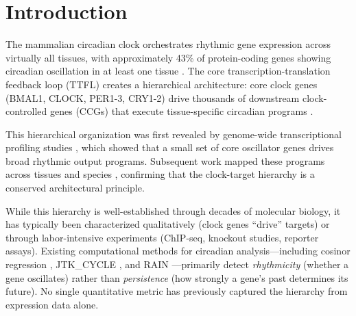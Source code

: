 \documentclass[11pt,letterpaper]{article}
\begin{document}
\begin{abstract}
\noindent\textbf{Conclusions:} The AR(2) eigenvalue modulus is a valid, robust, and biologically meaningful measure of temporal persistence in gene expression. A two-coefficient model recovers circadian hierarchy without prior biological knowledge, validated across species, tissues, experimental perturbations, literature benchmarks, and non-circadian contexts.

\noindent\textbf{Keywords:} autoregressive model, eigenvalue modulus, circadian rhythm, temporal persistence, gene expression, cross-species validation, literature validation, falsification
\end{abstract}

\section{Introduction}

The mammalian circadian clock orchestrates rhythmic gene expression across virtually all tissues, with approximately 43\% of protein-coding genes showing circadian oscillation in at least one tissue \citep{zhang2014circadian}. The core transcription-translation feedback loop (TTFL) creates a hierarchical architecture: core clock genes (BMAL1, CLOCK, PER1-3, CRY1-2) drive thousands of downstream clock-controlled genes (CCGs) that execute tissue-specific circadian programs \citep{takahashi2017transcriptional, reppert2002coordination}.

This hierarchical organization was first revealed by genome-wide transcriptional profiling studies \citep{panda2002coordinated, storch2002extensive, ueda2002system}, which showed that a small set of core oscillator genes drives broad rhythmic output programs. Subsequent work mapped these programs across tissues and species \citep{zhang2014circadian, mure2018diurnal, storch2007daily}, confirming that the clock-target hierarchy is a conserved architectural principle.

While this hierarchy is well-established through decades of molecular biology, it has typically been characterized qualitatively (clock genes ``drive'' targets) or through labor-intensive experiments (ChIP-seq, knockout studies, reporter assays). Existing computational methods for circadian analysis---including cosinor regression \citep{cornelissen2014cosinor}, JTK\_CYCLE \citep{hughes2010jtk}, and RAIN \citep{thaben2014detecting}---primarily detect \textit{rhythmicity} (whether a gene oscillates) rather than \textit{persistence} (how strongly a gene's past determines its future). No single quantitative metric has previously captured the hierarchy from expression data alone.
\end{document}
